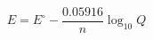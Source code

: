 \documentclass[preview]{standalone}
\begin{document}
\[E = E^\circ - \frac{0.05916}{n} \log_{10} Q \tag{1.6}\]
\end{document}
